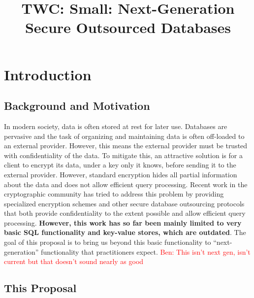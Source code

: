 \documentclass[11pt]{article}
\title{{{\Large{TWC: Small:  Next-Generation Secure Outsourced Databases}}}}
\date{}
\newcommand{\ben}[1]{\textcolor{red}{Ben: #1}}
\theoremstyle{remark}
\begin{document}
\maketitle
\vspace{-20mm}

\section{Introduction}

\subsection{Background and Motivation} 

In modern society, data is often stored at rest for later use.  Databases are pervasive and the task of organizing and maintaining data is often off-loaded to an external provider. However, this means the external provider must be trusted with confidentiality of the data.  To mitigate this, an attractive solution is for a client to encrypt its data, under a key only it knows, before sending it to the external provider.  However, standard encryption hides all partial information about the data and does not allow efficient query processing.  Recent work in the cryptographic community has tried to address this problem by providing specialized encryption schemes and other secure database outsourcing protocols that both provide confidentiality to the extent possible and allow efficient query processing.  \textbf{However, this work has so far been mainly limited to very basic SQL functionality and key-value stores, which are outdated}.  The goal of this proposal is to bring us beyond this basic functionality to ``next-generation'' functionality that practitioners expect.  
\ben{This isn't next gen, isn't current but that doesn't sound nearly as good}

\subsection{This Proposal} \label{subsec-prop}
\end{document}
